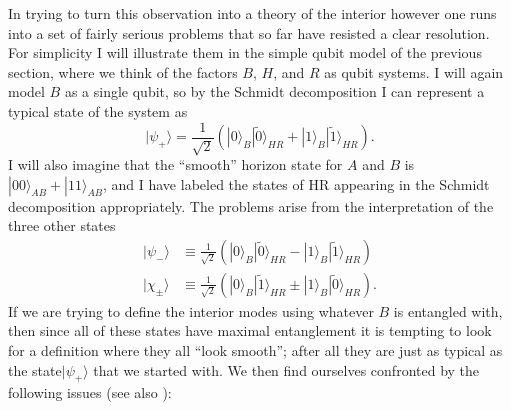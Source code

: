 \documentclass[12pt]{article}
\newcommand{\be}{\begin{equation}}
\newcommand{\ee}{\end{equation}}
\newcommand{\ran}{\rangle}
\newcommand{\wt}{\widetilde}
\begin{document}
In trying to turn this observation into a theory of the interior however one runs into a set of fairly serious problems that so far have resisted a clear resolution.  For simplicity I will illustrate them in the simple qubit model of the previous section, where we think of the factors $B$, $H$, and $R$ as qubit systems.  I will again model $B$ as a single qubit, so by the Schmidt decomposition I can represent a typical state of the system as
\be\label{sdstate}
|\psi_+\ran=\frac{1}{\sqrt{2}}\left(|0\ran_B|\wt{0}\ran_{HR}+|1\ran_B|\wt{1}\ran_{HR}\right).
\ee
I will also imagine that the ``smooth'' horizon state for $A$ and $B$ is $|00\ran_{AB}+|11\ran_{AB}$, and I have labeled the states of HR appearing in the Schmidt decomposition appropriately.  The problems arise from the interpretation of the three other states
\begin{align}\nonumber
|\psi_-\ran&\equiv\frac{1}{\sqrt{2}}\left(|0\ran_B|\wt{0}\ran_{HR}-|1\ran_B|\wt{1}\ran_{HR}\right)\\
|\chi_\pm\ran&\equiv\frac{1}{\sqrt{2}}\left(|0\ran_B|\wt{1}\ran_{HR}\pm|1\ran_B|\wt{0}\ran_{HR}\right).
\end{align}
If we are trying to define the interior modes using whatever $B$ is entangled with, then since all of these states have maximal entanglement it is tempting to look for a definition where they all ``look smooth''; after all they are just as typical as the state$|\psi_+\ran$ that we started with.  We then find ourselves confronted by the following issues \cite{Almheiri:2013hfa,Bousso:2013ifa,Harlow:2014yoa} (see also \cite{Bousso:2012as,Chowdhury:2013mka}):
\end{document}
